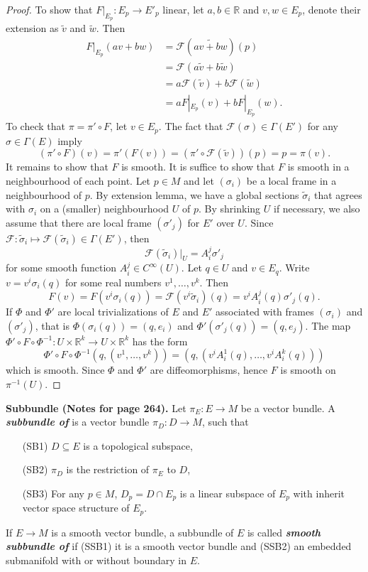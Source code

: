 \documentclass[a4paper]{article}
\theoremstyle{remark}
\newcommand{\er}{\mathbb{R}} %
\newcommand{\rk}{\mathbb{R}^k} %
\newcommand{\subhim}{\subseteq} %
\newcommand{\Esection}{\Gamma(E)} %
\newcommand{\Eprimesection}{\Gamma(E')}
\newcommand{\Fkeriting}{\mathscr{F}} %
\begin{document}
\begin{proof}
To show that $F|_{E_p} : E_p \to E'_p$ linear, let $a,b \in \er$ and $v,w \in E_p$, denote their extension as $\widetilde{v}$ and $\widetilde{w}$. Then
\begin{align*}
F|_{E_p} (av+bw) &= \Fkeriting(\widetilde{av+bw}) (p)\\ &= \Fkeriting (a \widetilde{v}+b \widetilde{w})\\ &= a \Fkeriting(\widetilde{v}) + b \Fkeriting(\widetilde{w}) \\ &= aF|_{E_p} (v) + b F|_{E_p} (w).
\end{align*}
To check that $\pi = \pi' \circ F$, let $v \in E_p$. The fact that $\Fkeriting (\sigma) \in \Eprimesection$ for any $\sigma \in \Esection$ imply
$$
(\pi' \circ F) (v) = \pi' (F(v)) = (\pi' \circ \Fkeriting(\widetilde{v}) )(p) = p = \pi(v).
$$
It remains to show that $F$ is smooth. It is suffice to show that $F$ is smooth in a neighbourhood of each point. Let $p \in M$ and let $(\sigma_i)$ be a local frame in a neighbourhood of $p$. By extension lemma, we have a global sections $\widetilde{\sigma}_i$ that agrees with $\sigma_i$ on a (smaller) neighbourhood $U$ of $p$. By shrinking $U$ if necessary, we also assume that there are local frame $(\sigma'_j)$ for $E'$ over $U$. Since $\Fkeriting : \widetilde{\sigma}_i \mapsto \Fkeriting(\widetilde{\sigma}_i) \in \Eprimesection$, then 
$$
\Fkeriting(\widetilde{\sigma}_i)|_U = A^j_i \sigma'_j
$$
for some smooth function $A^j_i \in C^{\infty}(U)$. Let $q \in U$ and $v \in E_q$. Write $v = v^i \sigma_i(q)$ for some real numbers $v^1,\dots,v^k$. Then
$$
F(v) = F(v^i \sigma_i(q)) = \Fkeriting(v^i \widetilde{\sigma}_i)(q) = v^i A^j_i(q) \sigma'_j(q).
$$
If $\Phi$ and $\Phi'$ are local trivializations of $E$ and $E'$ associated with frames $(\sigma_i)$ and $(\sigma'_j)$, that is $\Phi (\sigma_i(q)) =(q,e_i)$ and $\Phi' (\sigma'_j (q)) = (q,e_j)$. The map $\Phi' \circ F \circ \Phi^{-1} : U \times \rk \to U \times \rk$ has the form
$$
\Phi' \circ F \circ \Phi^{-1} (q, (v^1,\dots,v^k)) = (q, (v^i A_i^1(q),\dots, v^iA_i^k(q) ) )
$$  
which is smooth. Since $\Phi$ and $\Phi'$ are diffeomorphisms, hence $F$ is smooth on $\pi^{-1}(U)$.
\end{proof}

\textbf{Subbundle (Notes for  page 264).} Let $\pi_E : E \to M$ be a vector bundle. A \textbf{\textit{subbundle of }} is a vector bundle $\pi_D : D \to M$, such that 
\begin{enumerate}[nolistsep]
\item[(SB1)] $D \subhim E$ is a topological subspace,
\item[(SB2)] $\pi_D$ is the restriction of $\pi_E$ to $D$,
\item[(SB3)] For any $p \in M$, $D_p = D \cap E_p$ is a linear subspace of $E_p$ with inherit vector space structure of $E_p$.
\end{enumerate} 
If $E \to M$ is a smooth vector bundle, a subbundle of $E$ is called \textbf{\textit{smooth subbundle of }} if (SSB1) it is a smooth vector bundle and (SSB2) an embedded submanifold with or without boundary in $E$.
\end{document}

